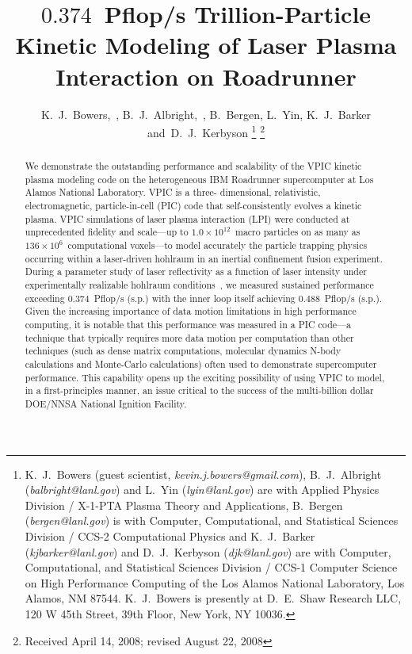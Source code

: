 \documentclass[journal,twoside]{IEEEtran}
\begin{document}
\title{$0.374$~Pflop/s Trillion-Particle Kinetic Modeling of Laser Plasma
Interaction on Roadrunner}

\author{K.~J.~Bowers,~,
        B.~J.~Albright,~,
        B.~Bergen,
        L.~Yin,           %
        K.~J.~Barker
        and~D.~J.~Kerbyson%
\thanks{
K.~J.~Bowers (guest scientist, \emph{kevin.j.bowers@gmail.com}),
B.~J.~Albright (\emph{balbright@lanl.gov}) and L.~Yin
(\emph{lyin@lanl.gov}) are with Applied Physics Division / X-1-PTA
Plasma Theory and Applications, B.~Bergen (\emph{bergen@lanl.gov}) is
with Computer, Computational, and Statistical Sciences Division /
CCS-2 Computational Physics and K.~J.~Barker
(\emph{kjbarker@lanl.gov}) and D.~J.~Kerbyson (\emph{djk@lanl.gov})
are with Computer, Computational, and Statistical Sciences Division /
CCS-1 Computer Science on High Performance Computing of the Los Alamos
National Laboratory, Los Alamos, NM 87544.  K.~J.~Bowers is presently
at D.~E.~Shaw Research LLC, 120 W 45th Street, 39th Floor, New York,
NY 10036.}%
\thanks{Received April 14, 2008; revised August 22, 2008}
}


\maketitle

\begin{abstract}
We demonstrate the outstanding performance and scalability of the VPIC
kinetic plasma modeling code on the heterogeneous IBM Roadrunner
supercomputer at Los Alamos National Laboratory.  VPIC is a three-
dimensional, relativistic, electromagnetic, particle-in-cell (PIC)
code that self-consistently evolves a kinetic plasma.  VPIC
simulations of laser plasma interaction (LPI) were conducted at
unprecedented fidelity and scale---up to $1.0 \times 10^{12}$~macro
particles on as many as $136 \times 10^6$~computational voxels---to
model accurately the particle trapping physics occurring within a
laser-driven hohlraum in an inertial confinement fusion experiment.
During a parameter study of laser reflectivity as a function of laser
intensity under experimentally realizable hohlraum
conditions~\cite{AAC_Conference_Paper}, we measured sustained
performance exceeding $0.374$~Pflop/s (s.p.) with the inner loop
itself achieving $0.488$~Pflop/s (s.p.).  Given the increasing
importance of data motion limitations in high performance computing,
it is notable that this performance was measured in a PIC code---a
technique that typically requires more data motion per computation
than other techniques (such as dense matrix computations, molecular
dynamics N-body calculations and Monte-Carlo calculations) often used
to demonstrate supercomputer performance.  This capability opens up
the exciting possibility of using VPIC to model, in a first-principles
manner, an issue critical to the success of the multi-billion dollar
DOE/NNSA National Ignition Facility.
\end{abstract}
\end{document}
